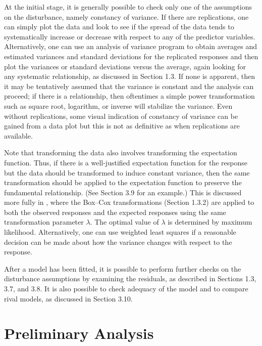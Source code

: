 At the initial stage, it is generally possible to check only one
of the assumptions on the disturbance, namely constancy of variance.
If there are replications, one can simply plot the data and look
to see if the spread of the data tends to systematically increase
or decrease with respect to any of the predictor
variables.
Alternatively, one can use an analysis of variance program to
obtain averages and estimated variances and standard deviations for the
replicated responses and then plot the variances or standard deviations
versus the average, again looking for any
systematic relationship, as discussed in Section 1.3.
If none is apparent, then it may be tentatively assumed that the
variance is constant and the analysis can proceed;  if there is a
relationship, then oftentimes a simple power transformation such
as square root, logarithm, or inverse will stabilize the variance.
Even without replications, some visual indication of constancy of
variance can be gained from a data plot but this is
not as definitive as when replications are available.

Note that transforming the data also involves transforming the
expectation function.
Thus, if there is a well-justified expectation function for the
response but the data should be transformed to induce constant
variance, then the same transformation should be applied to the expectation
function to preserve the fundamental relationship.
(See Section 3.9 for an example.)
This is discussed more fully in ,
where the Box--Cox transformations (Section 1.3.2)
are applied to both the
observed responses and the expected responses using the same
transformation parameter $\lambda$.
The optimal value of $\lambda$ is determined by maximum likelihood.
Alternatively, one can use weighted least squares
\cite{drap:smit:1998} if a
reasonable decision can be made about how the
variance changes with respect to the response.

After a model has been fitted, it is possible to perform further
checks on the disturbance assumptions by examining the residuals,
as described in Sections 1.3, 3.7, and 3.8.
It is also possible to check adequacy of the model and to compare
rival models, as discussed in Section 3.10.

\section{Preliminary Analysis}

